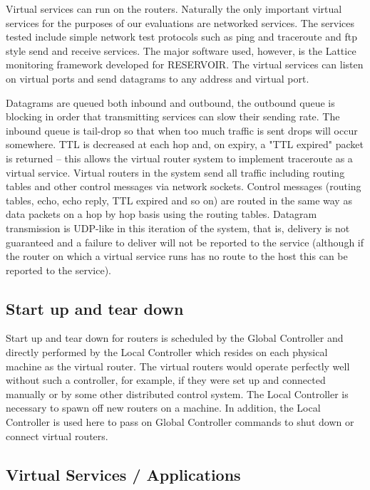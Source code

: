 Virtual services can run on the routers.  Naturally the only important
virtual services for the purposes of our evaluations are networked
services.  The services
tested include simple network test protocols such as ping and traceroute and
ftp style send and receive services.
The major software used, however, is the Lattice monitoring framework developed for
 RESERVOIR.  
The virtual services can listen on virtual ports and send datagrams to any
address and virtual port.

Datagrams are queued both inbound and outbound, the outbound queue is blocking 
in order that transmitting services can slow their sending rate.
The inbound queue is tail-drop so that when too much traffic is sent drops
will occur somewhere.  TTL is decreased at each hop and, on expiry, a "TTL
expired" packet is returned -- this allows the virtual router system to
implement traceroute as a virtual service.  Virtual routers in the 
system send all traffic including routing tables and other control messages
via network sockets.  Control messages (routing tables, echo, echo reply,
TTL expired and so on) are routed in the same way as data packets on a
hop by hop basis using the routing tables.  
Datagram transmission is UDP-like in this
iteration of the system, that is, delivery is not guaranteed and a failure
to deliver will not be reported to the service (although if the router
on which a virtual service runs
has no route to the host this can be reported to the service).

\subsection{Start up and tear down}

Start up and tear down for routers is scheduled by the Global Controller
and directly performed by the Local Controller which resides on each
physical machine as the virtual router.   The
virtual routers would operate perfectly well without such a controller,
for example, if they were set up and connected manually or by some other
distributed control system.  The Local Controller is necessary to
spawn off new routers on a machine.
In addition, the Local Controller is used here to
pass on Global Controller commands to shut down or connect virtual
routers.  

\subsection{Virtual Services / Applications}

